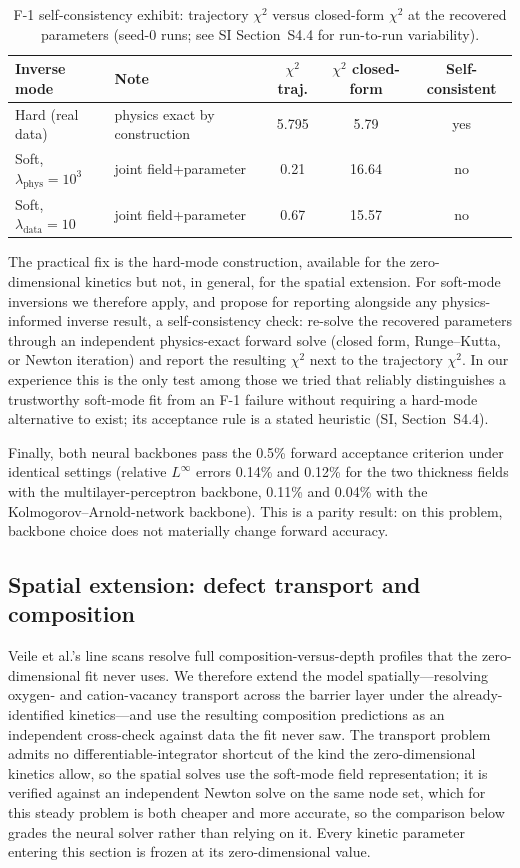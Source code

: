 \documentclass[preprint,12pt]{elsarticle}
\begin{document}
\begin{table}[htbp]
\centering
\caption{F-1 self-consistency exhibit: trajectory $\chi^2$ versus
closed-form $\chi^2$ at the recovered parameters (seed-0 runs; see SI
Section~S4.4 for run-to-run variability).}
\label{tab:f1}
\scriptsize
\begin{tabular}{llccc}
\toprule
Inverse mode & Note & $\chi^2$ traj. & $\chi^2$ closed-form & Self-consistent \\
\midrule
Hard (real data) & physics exact by construction & 5.795 & 5.79 & yes \\
Soft, $\lambda_\text{phys}=10^3$ & joint field+parameter & 0.21 & 16.64 & no \\
Soft, $\lambda_\text{data}=10$ & joint field+parameter & 0.67 & 15.57 & no \\
\bottomrule
\end{tabular}
\end{table}

The practical fix is the hard-mode construction, available for the
zero-dimensional kinetics but not, in general, for the spatial
extension. For soft-mode inversions we therefore apply, and propose for
reporting alongside any physics-informed inverse result, a
self-consistency check: re-solve the recovered parameters through an
independent physics-exact forward solve (closed form, Runge--Kutta, or
Newton iteration) and report the resulting $\chi^2$ next to the
trajectory $\chi^2$. In our experience this is the only test among
those we tried that reliably distinguishes a trustworthy soft-mode fit
from an F-1 failure without requiring a hard-mode alternative to exist;
its acceptance rule is a stated heuristic (SI, Section~S4.4).

Finally, both neural backbones pass the 0.5\% forward acceptance
criterion under identical settings (relative $L^\infty$ errors 0.14\%
and 0.12\% for the two thickness fields with the multilayer-perceptron
backbone, 0.11\% and 0.04\% with the Kolmogorov--Arnold-network
backbone). This is a parity result: on this problem, backbone choice
does not materially change forward accuracy.

\subsection{Spatial extension: defect transport and composition}\label{sec:spatial}

Veile et al.'s line scans resolve full composition-versus-depth
profiles that the zero-dimensional fit never uses. We therefore extend
the model spatially---resolving oxygen- and cation-vacancy transport
across the barrier layer under the already-identified kinetics---and
use the resulting composition predictions as an independent cross-check
against data the fit never saw. The transport problem admits no
differentiable-integrator shortcut of the kind the zero-dimensional
kinetics allow, so the spatial solves use the soft-mode field
representation; it is verified against an independent Newton solve on
the same node set, which for this steady problem is both cheaper and
more accurate, so the comparison below grades the neural solver rather
than relying on it. Every kinetic parameter entering this section is
frozen at its zero-dimensional value.
\end{document}
